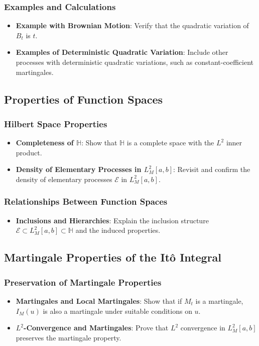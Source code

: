 \subsubsection{Examples and Calculations}
\begin{itemize}
    \item \textbf{Example with Brownian Motion}: Verify that the quadratic variation of $B_t$ is $t$.
    \item \textbf{Examples of Deterministic Quadratic Variation}: Include other processes with deterministic quadratic variations, such as constant-coefficient martingales.
\end{itemize}

\subsection{Properties of Function Spaces}

\subsubsection{Hilbert Space Properties}
\begin{itemize}
    \item \textbf{Completeness of $\mathbb{H}$}: Show that $\mathbb{H}$ is a complete space with the $L^2$ inner product.
    \item \textbf{Density of Elementary Processes in $L^2_M[a,b]$}: Revisit and confirm the density of elementary processes $\mathcal{E}$ in $L^2_M[a,b]$.
\end{itemize}

\subsubsection{Relationships Between Function Spaces}
\begin{itemize}
    \item \textbf{Inclusions and Hierarchies}: Explain the inclusion structure $\mathcal{E} \subset L^2_M[a,b] \subset \mathbb{H}$ and the induced properties.
\end{itemize}

\subsection{Martingale Properties of the Itô Integral}

\subsubsection{Preservation of Martingale Properties}
\begin{itemize}
    \item \textbf{Martingales and Local Martingales}: Show that if $M_t$ is a martingale, $I_M(u)$ is also a martingale under suitable conditions on $u$.
    \item \textbf{$L^2$-Convergence and Martingales}: Prove that $L^2$ convergence in $L^2_M[a,b]$ preserves the martingale property.
\end{itemize}

